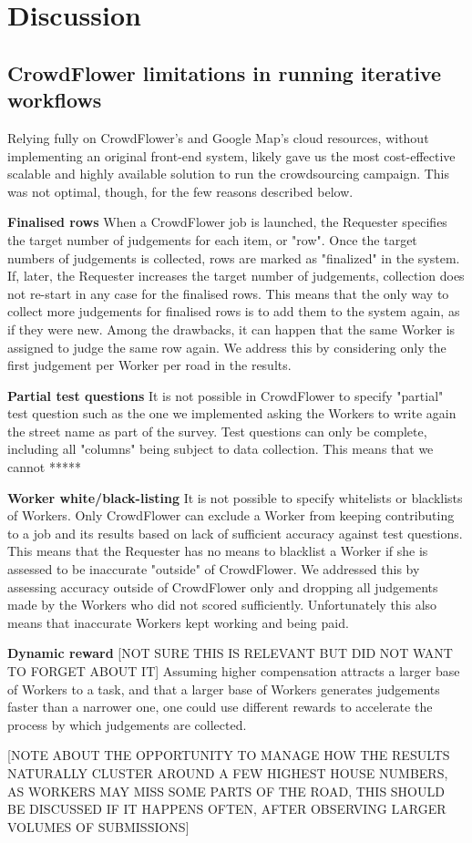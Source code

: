 \section{Discussion}

\subsection{CrowdFlower limitations in running iterative workflows}

Relying fully on CrowdFlower's and Google Map's cloud resources, without implementing an original front-end system, likely gave us the most cost-effective scalable and highly available solution to run the crowdsourcing campaign. This was not optimal, though, for the few reasons described below. 

\textbf{Finalised rows} When a CrowdFlower job is launched, the Requester specifies the target number of judgements for each item, or "row". Once the target numbers of judgements is collected, rows are marked as "finalized" in the system. If, later, the Requester increases the target number of judgements, collection does not re-start in any case for the finalised rows. This means that the only way to collect more judgements for finalised rows is to add them to the system again, as if they were new. Among the drawbacks, it can happen that the same Worker is assigned to judge the same row again. We address this by considering only the first judgement per Worker per road in the results.

\textbf{Partial test questions} It is not possible in CrowdFlower to specify "partial" test question such as the one we implemented asking the Workers to write again the street name as part of the survey. Test questions can only be complete, including all "columns" being subject to data collection. This means that we cannot *****  

\textbf{Worker white/black-listing} It is not possible to specify whitelists or blacklists of Workers. Only CrowdFlower can exclude a Worker from keeping contributing to a job and its results based on lack of sufficient accuracy against test questions. This means that the Requester has no means to blacklist a Worker if she is assessed to be inaccurate "outside" of CrowdFlower. We addressed this by assessing accuracy outside of CrowdFlower only and dropping all judgements made by the Workers who did not scored sufficiently. Unfortunately this also means that inaccurate Workers kept working and being paid.

\textbf{Dynamic reward} [NOT SURE THIS IS RELEVANT BUT DID NOT WANT TO FORGET ABOUT IT] Assuming higher compensation attracts a larger base of Workers to a task, and that a larger base of Workers generates judgements faster than a narrower one, one could use different rewards to accelerate the process by which judgements are collected.

[NOTE ABOUT THE OPPORTUNITY TO MANAGE HOW THE RESULTS NATURALLY CLUSTER AROUND A FEW HIGHEST HOUSE NUMBERS, AS WORKERS MAY MISS SOME PARTS OF THE ROAD, THIS SHOULD BE DISCUSSED IF IT HAPPENS OFTEN, AFTER OBSERVING LARGER VOLUMES OF SUBMISSIONS]